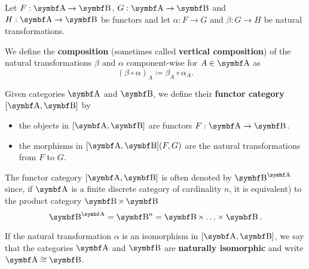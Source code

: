 \begin{definition}\label{def:natural_transformation_composition}
  Let \( F: \Bold A \to \Bold B \), \( G: \Bold A \to \Bold B \) and \( H: \Bold A \to \Bold B \) be functors and let \( \alpha: F \to G \) and \( \beta: G \to H \) be natural transformations.

  We define the \textbf{composition} (sometimes called \textbf{vertical composition}) of the natural transformations \( \beta \) and \( \alpha \) component-wise for \( A \in \Bold A \) as
  \begin{equation*}
    (\beta \circ \alpha)_A \coloneqq \beta_{A} \circ \alpha_A.
  \end{equation*}
\end{definition}

\begin{definition}\label{def:functor_category}
  Given categories \( \Bold A \) and \( \Bold B \), we define their \textbf{functor category} \( [\Bold A, \Bold B] \) by
  \begin{itemize}
    \item the objects in \( [\Bold A, \Bold B] \) are functors \( F: \Bold A \to \Bold B \).
    \item the morphisms in \( [\Bold A, \Bold B](F, G) \) are the natural transformations from \( F \) to \( G \).
  \end{itemize}

  The functor category \( [\Bold A, \Bold B] \) is often denoted by \( {\Bold B}^{\Bold A} \) since, if \( \Bold A \) is a finite discrete category of cardinality \( n \), it is equivalent) to the product category \( \Bold B \times \Bold B \)
  \begin{equation*}
    {\Bold B}^{\Bold A} = {\Bold B}^n = \Bold B \times \ldots \times \Bold B.
  \end{equation*}

  If the natural transformation \( \alpha \) is an isomorphism in \( [\Bold A, \Bold B] \), we say that the categories \( \Bold A \) and \( \Bold B \) are \textbf{naturally isomorphic} and write \( \Bold A \cong \Bold B \).
\end{definition}

